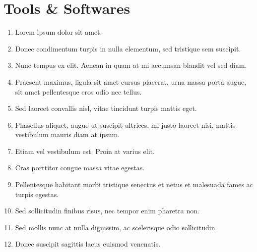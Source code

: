 
\section{Tools \& Softwares}

\begin{enumerate}
	\item Lorem ipsum dolor sit amet.
	\item Donec condimentum turpis in nulla elementum, sed tristique sem suscipit. 
	\item Nunc tempus ex elit. Aenean in quam at mi accumsan blandit vel sed diam. 
	\item Praesent maximus, ligula sit amet cursus placerat, urna massa porta augue, sit amet pellentesque eros odio nec tellus. 
	\item Sed laoreet convallis nisl, vitae tincidunt turpis mattis eget.
	\item  Phasellus aliquet, augue ut suscipit ultrices, mi justo laoreet nisi, mattis vestibulum mauris diam at ipsum. 
	\item Etiam vel vestibulum est. Proin at varius elit. 
	\item Cras porttitor congue massa vitae egestas. 
	\item Pellentesque habitant morbi tristique senectus et netus et malesuada fames ac turpis egestas. 
	\item Sed sollicitudin finibus risus, nec tempor enim pharetra non. 
	\item Sed mollis nunc at nulla dignissim, ac scelerisque odio sollicitudin. 
	\item Donec suscipit sagittis lacus euismod venenatis.
\end{enumerate}

